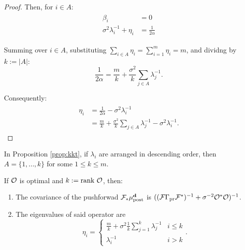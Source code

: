 \begin{proof}
  Then, for $i \in A$:
  \begin{align*}
    \begin{split}
      \beta_i &= 0\\
      \sigma^{2}\lambda_i^{-1} + \eta_i  &= \frac{1}{2\alpha}%
    \end{split}
  \end{align*}
  
  Summing over $i \in A$, substituting $\sum_{i\in A} \eta_i =
  \sum_{i=1}^m \eta_i = m$, and dividng by $k:= |A|$:
  $$
  \frac{1}{2\alpha} = \frac{m}{k} + \frac{\sigma^2}{k} \sum_{j\in A} \lambda_j^{-1}.
  $$

  Consequently:
  \begin{align} \label{eq:etas}
    \begin{split}
      \eta_i &= \frac{1}{2\alpha} - \sigma^2 \lambda_i^{-1}\\
      &=\frac{m}{k} + \frac{\sigma^2}{k} \sum_{j\in A} \lambda_j^{-1} - \sigma^2 \lambda_i^{-1}.%
    \end{split}
  \end{align}
\end{proof}

\begin{corollary}\label{cor:descending}
  In Proposition \ref{prop:kkt}, if $\lambda_i$ are arranged in
  descending order, then $A= \{1,\dots,k\}$ for some $1 \leq k \leq
  m$.
\end{corollary}

\begin{corollary}\label{cor:eigenvalues}
  If $\mathcal{O}$ is optimal and $k := \textup{rank}\  \mathcal{O}$, then:
  \begin{enumerate}
    \item The covariance of the pushforwad $\mathcal{F}_{*} \mu_{\textup{post}}^{\mathbf{d}}$ is $((\mathcal{F}
      \Gamma_{\textup{pr}} \mathcal{F}^*)^{-1} + \sigma^{-2} \mathcal{O}^*\mathcal{O})^{-1}$.
    \item The eigenvalues of said operator are
      \begin{equation}
        \eta_i = \begin{cases}
          \frac{m}{k} + \sigma^2 \frac{1}{k} \sum_{j=1}^k \lambda_j^{-1} & i \leq k \\
          \lambda_i^{-1} & i > k 
        \end{cases}.
      \end{equation}
  \end{enumerate}
\end{corollary}

